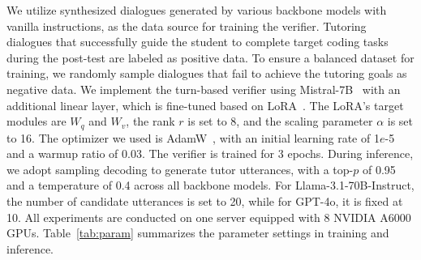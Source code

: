 We utilize synthesized dialogues generated by various backbone models with vanilla instructions, as the data source for training the verifier. Tutoring dialogues that successfully guide the student to complete target coding tasks during the post-test are labeled as positive data. To ensure a balanced dataset for training, we randomly sample dialogues that fail to achieve the tutoring goals as negative data. We implement the turn-based verifier using Mistral-7B~\cite{jiang2023mistral} with an additional linear layer, which is fine-tuned based on LoRA~\cite{hu2022lora}. The LoRA's target modules are $W_q$ and $W_v$, the rank $r$ is set to 8, and the scaling parameter $\alpha$ is set to 16. The optimizer we used is AdamW~\cite{loshchilov2018decoupled}, with an initial learning rate of 1$e$-5 and a warmup ratio of 0.03. The verifier is trained for 3 epochs. During inference, we adopt sampling decoding to generate tutor utterances, with a top-$p$ of 0.95 and a temperature of 0.4 across all backbone models. For Llama-3.1-70B-Instruct, the number of candidate utterances is set to 20, while for GPT-4o, it is fixed at 10. All experiments are conducted on one server equipped with 8 NVIDIA A6000 GPUs. Table~\ref{tab:param} summarizes the parameter settings in training and inference.

\begin{table}[t!]
\centering
{}
\caption{Parameter settings in training and inference.}
\label{tab:param}
\end{table}



